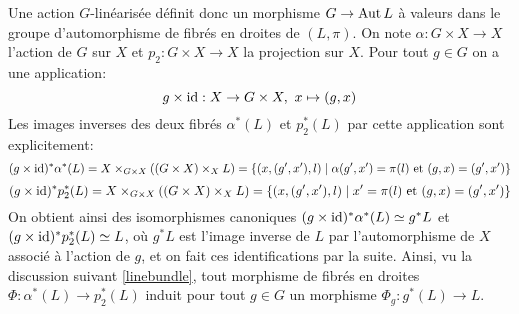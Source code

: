Une action $G$-linéarisée définit donc un morphisme $G\rightarrow \operatorname{Aut} L$ à valeurs dans le groupe d'automorphisme de fibrés en droites de $(L,\pi)$. On note $\alpha: G\times X\rightarrow X$ l'action de $G$ sur $X$ et $p_2:G\times X\rightarrow X$ la projection sur $X$. Pour tout $g\in G$ on a une application:
$$g\times \operatorname{id}: X\rightarrow G\times X,\,\, x\mapsto (g,x)$$ 
Les images inverses des deux fibrés $\alpha^*(L)$ et $p_2^*(L)$ par cette application sont explicitement: 
$$(g\times \operatorname{id})^*\alpha^*(L)=X\times_{G\times X}((G\times X)\times_X L)=\lbrace (x,(g',x'),l)\mid \alpha(g',x')=\pi(l)\text{ et } (g,x)=(g',x')\rbrace$$
$$(g\times \operatorname{id})^*p_2^*(L)=X\times_{G\times X}((G\times X)\times_X L)=\lbrace (x,(g',x'),l)\mid x'=\pi(l)\text{ et } (g,x)=(g',x')\rbrace$$
On obtient ainsi des isomorphismes canoniques $(g\times \operatorname{id})^*\alpha^*(L)\simeq g^*L$ et $(g\times \operatorname{id})^*p_2^*(L)\simeq L$, où $g^*L$ est l'image inverse de $L$ par l'automorphisme de $X$ associé à l'action de $g$, et on fait ces identifications par la suite. Ainsi, vu la discussion suivant \ref{linebundle}, tout morphisme de fibrés en droites $\Phi: \alpha^*(L)\rightarrow p_2^*(L)$ induit pour tout $g\in G$ un morphisme $\Phi_g:g^*(L)\rightarrow L$.

